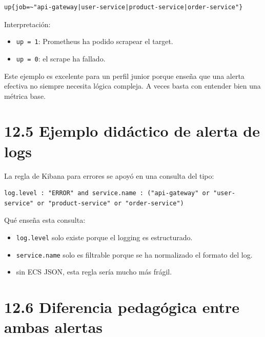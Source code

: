 \documentclass[
a4paper,
12pt]{report}
\providecommand{\tightlist}{%
  \setlength{\itemsep}{0pt}\setlength{\parskip}{0pt}}
\begin{document}
\begin{verbatim}
up{job=~"api-gateway|user-service|product-service|order-service"}
\end{verbatim}

Interpretación:

\begin{itemize}
\tightlist
\item
  \texttt{up\ =\ 1}: Prometheus ha podido scrapear el target.
\item
  \texttt{up\ =\ 0}: el scrape ha fallado.
\end{itemize}

Este ejemplo es excelente para un perfil junior porque enseña que una
alerta efectiva no siempre necesita lógica compleja. A veces basta con
entender bien una métrica base.

\section{12.5 Ejemplo didáctico de alerta de
logs}\label{ejemplo-diduxe1ctico-de-alerta-de-logs}

La regla de Kibana para errores se apoyó en una consulta del tipo:

\begin{verbatim}
log.level : "ERROR" and service.name : ("api-gateway" or "user-service" or "product-service" or "order-service")
\end{verbatim}

Qué enseña esta consulta:

\begin{itemize}
\tightlist
\item
  \texttt{log.level} solo existe porque el logging es estructurado.
\item
  \texttt{service.name} solo es filtrable porque se ha normalizado el
  formato del log.
\item
  sin ECS JSON, esta regla sería mucho más frágil.
\end{itemize}

\section{12.6 Diferencia pedagógica entre ambas
alertas}\label{diferencia-pedaguxf3gica-entre-ambas-alertas}
\end{document}
